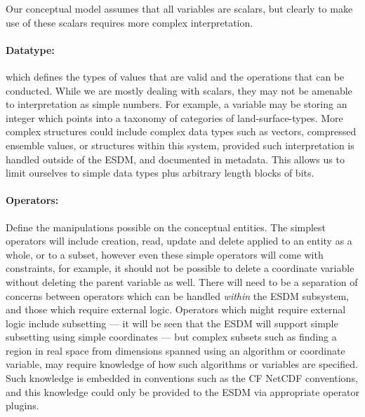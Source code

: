Our conceptual model assumes that all variables are scalars, but clearly to make use of these scalars requires more complex interpretation.

\paragraph{Datatype:}
which defines the types of values that are valid and the operations that can be conducted.
While we are mostly dealing with scalars, they may not be amenable to interpretation as simple numbers.
For example, a variable may be storing an integer which points into a taxonomy of categories of land-surface-types.
More complex structures could include complex data types such as vectors, compressed ensemble values, or structures within this system, provided such interpretation is handled outside of the ESDM, and documented in metadata.  This allows us to limit ourselves to simple data types plus arbitrary length blocks of bits.

\paragraph{Operators:} Define the manipulations possible on the conceptual entities. The simplest operators will include creation, read, update and delete applied to an entity as a whole, or to a subset, however even these simple operators will come with constraints, for example, it should not  be possible to delete a coordinate variable without deleting the parent variable as well. There will need to be a separation of concerns between operators which can be handled  \textit{within} the ESDM subsystem, and those which require external logic. Operators which might require external logic include subsetting --- it will be seen that the ESDM will support simple subsetting using simple coordinates ---  but complex subsets such as finding a region in real space from dimensions spanned using an algorithm or coordinate variable, may require knowledge of how such algorithms or variables are specified.
Such knowledge is embedded in conventions such as the CF NetCDF conventions, and this knowledge could only be provided to the ESDM via appropriate operator plugins.




